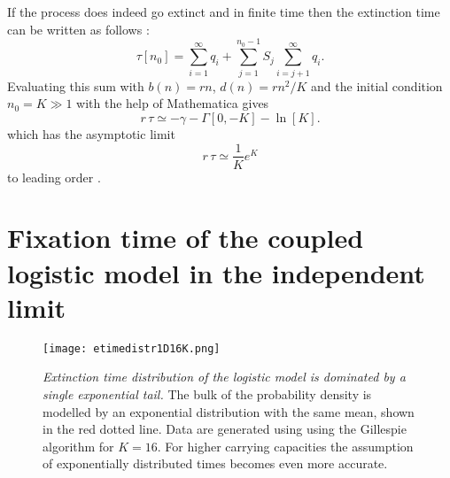 If the process does indeed go extinct and in finite time then the extinction time can be written as follows \cite{Nisbet1982}:
\begin{equation} \label{etime-approx0}
\tau[n_0] = \sum_{i=1}^{\infty}q_i + \sum_{j=1}^{n_0-1} S_j\sum_{i=j+1}^{\infty}q_i.
\end{equation}
Evaluating this sum with $b(n)=r n$, $d(n)=rn^2/K$ and the initial condition $n_0 = K \gg 1$ with the help of Mathematica gives
\begin{equation*}
r\,\tau \simeq -\gamma - \Gamma[0,-K] - \ln[K].
\end{equation*}
which has the asymptotic limit
\begin{equation} \label{1Dlog}
r\,\tau \simeq \frac{1}{K}e^K
\end{equation}
to leading order \cite{Lande1993}.


\section{Fixation time of the coupled logistic model in the independent limit}
\begin{figure}[ht]
	\texttt{[image: etimedistr1D16K.png]}
	\caption{\emph{Extinction time distribution of the logistic model is dominated by a single exponential tail.} 
		The bulk of the probability density is modelled by an exponential distribution with the same mean, shown in the red dotted line.  Data are generated using using the Gillespie algorithm for $K=16$. For higher carrying capacities the assumption of exponentially distributed times becomes even more accurate. } \label{etimedistr}
\end{figure}

